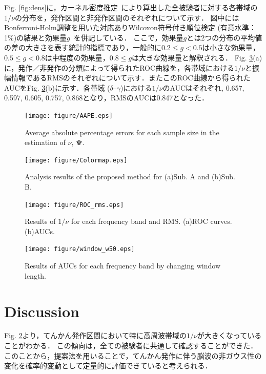 \documentclass[journal]{IEEEtran}
\begin{document}
Fig. \ref{fig:dens}に，カーネル密度推定~\cite{Parzen1962}により算出した全被験者に対する各帯域の$1/\nu$の分布を，発作区間と非発作区間のそれぞれについて示す．
図中にはBonferroni-Holm調整を用いた対応ありWilcoxon符号付き順位検定 (有意水準：1\%)の結果と効果量$g$~\cite{Hedges1981}を併記している．
ここで，効果量$g$とは2つの分布の平均値の差の大きさを表す統計的指標であり，一般的に$0.2 \leq g < 0.5$は小さな効果量，$0.5 \leq g < 0.8$は中程度の効果量，$0.8 \leq g$は大きな効果量と解釈される．
Fig. \ref{fig:roc}(a)に，発作／非発作の分類によって得られたROC曲線を，各帯域における$1/\nu$と振幅情報であるRMSのそれぞれについて示す．またこのROC曲線から得られたAUCをFig. \ref{fig:roc}(b)に示す．各帯域 ($\delta$--$\gamma$)における$1/\nu$のAUCはそれぞれ, 0.657, 0.597, 0.605, 0.757, 0.868となり，RMSのAUCは0.847となった．
\begin{figure}[!t]
\centering
\texttt{[image: figure/AAPE.eps]}
\caption{Average absolute percentage errors for each sample size in the estimation of $\nu$, $\mathbf{\Psi}$.}
\label{fig:ES_param}
\end{figure}


\begin{figure}[!t]
\centering
\texttt{[image: figure/Colormap.eps]}
\caption{Analysis results of the proposed method for (a)Sub. A and (b)Sub. B.}
\label{fig:Colormap}
\end{figure}

\begin{figure}[!t]
\centering
\texttt{[image: figure/ROC\_rms.eps]}
\caption{Results of $1/\nu$ for each frequency band and RMS. (a)ROC curves. (b)AUCs. }
\label{fig:roc}
\end{figure}

\begin{figure}[!t]
\centering
\texttt{[image: figure/window\_w50.eps]}
\caption{Results of AUCs for each frequency band by changing window length. }
\label{fig:window}
\end{figure}

\section{Discussion}
Fig. \ref{fig:Colormap}より，てんかん発作区間において特に高周波帯域の$1/\nu$が大きくなっていることがわかる．
この傾向は，全ての被験者に共通して確認することができた．このことから，提案法を用いることで，てんかん発作に伴う脳波の非ガウス性の変化を確率的変動として定量的に評価できていると考えられる．
\end{document}
